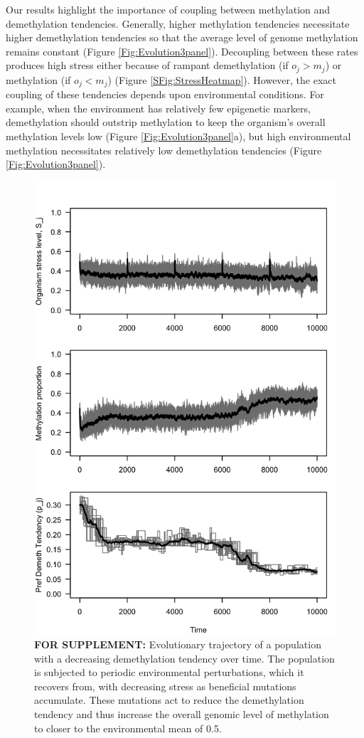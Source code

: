 \documentclass{article}
\begin{document}
Our results highlight the importance of coupling between methylation and demethylation tendencies. Generally, higher methylation tendencies necessitate higher demethylation tendencies so that the average level of genome methylation remains constant (Figure \ref{Fig:Evolution3panel}). Decoupling between these rates produces high stress either because of rampant demethylation (if $o_j > m_j$) or methylation (if $o_j < m_j$) (Figure \ref{SFig:StressHeatmap}). However, the exact coupling of these tendencies depends upon environmental conditions. For example, when the environment has relatively few epigenetic markers, demethylation should outstrip methylation to keep the organism's overall methylation levels low (Figure \ref{Fig:Evolution3panel}a), but high environmental methylation necessitates relatively low demethylation tendencies (Figure \ref{Fig:Evolution3panel}).


\begin{figure}
    \centering
    \includegraphics[width=0.8 \textwidth]{Figures/SFig_EvolutionSims.png}
    \caption{\textbf{FOR SUPPLEMENT:} Evolutionary trajectory of a population with a decreasing demethylation tendency over time. The population is subjected to periodic environmental perturbations, which it recovers from, with decreasing stress as beneficial mutations accumulate. These mutations act to reduce the demethylation tendency and thus increase the overall genomic level of methylation to closer to the environmental mean of 0.5.}
    \label{Sfig:evolutionts}
\end{figure}
\end{document}
